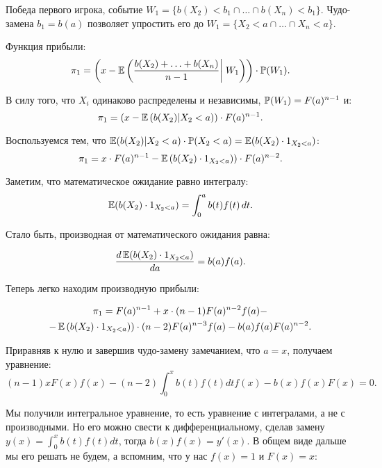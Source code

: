 \begin{enumerate}
Победа первого игрока, событие $ W_{1}=\{b(X_{2})<b_{1}\cap \ldots\cap b(X_{n})<b_{1}\} $. Чудо-замена  $b_{1}=b(a)$ позволяет упростить его до $ W_{1}=\{X_{2}<a\cap\ldots\cap X_{n}<a\} $.

Функция прибыли:
\begin{equation}
\pi_{1}=\left(x-\E\left(\frac{b(X_{2})+\ldots+b(X_{n})}{n-1} \right|\left.\vphantom{\frac{b(X_{2})+\ldots+b(X_{n})}{n-1}} W_{1}\right)\right)\cdot \P(W_{1}).
\end{equation}

В силу того, что $ X_{i} $ одинаково распределены и независимы, $ \P(W_{1})=F(a)^{n-1} $ и:
\begin{equation}
\pi_{1}=(x-\E\left(b(X_{2})|X_{2}<a)\right)\cdot F(a)^{n-1}.
\end{equation}

Воспользуемся тем, что $ \E(b(X_{2})|X_{2}<a)\cdot \P(X_{2}<a)=\E(b(X_{2})\cdot 1_{X_{2}<a}) $:
\begin{equation}
\pi_{1}=x\cdot F(a)^{n-1}-\E\left(b(X_{2})\cdot 1_{X_{2}<a})\right)\cdot F(a)^{n-2}.
\end{equation}

Заметим, что математическое ожидание равно интегралу:
\begin{equation}
\E(b(X_{2})\cdot 1_{X_{2}<a})=\int_{0}^{a}b(t)f(t) \, dt.
\end{equation}

Стало быть, производная от математического ожидания равна:

\begin{equation}
\frac{d \E(b(X_{2})\cdot 1_{X_{2}<a})}{d a}=b(a)f(a).
\end{equation}

Теперь легко находим производную прибыли:

\begin{multline}
\pi_{1}=F(a)^{n-1}+x\cdot (n-1) F(a)^{n-2}f(a)-\\
-\E\left(b(X_{2})\cdot 1_{X_{2}<a})\right)\cdot (n-2)F(a)^{n-3}f(a)-b(a)f(a)F(a)^{n-2}.
\end{multline}

Приравняв к нулю и завершив чудо-замену замечанием, что $ a=x $, получаем уравнение:
\begin{equation}
(n-1)xF(x)f(x)-(n-2)\int_{0}^{x}b(t)f(t)dt f(x)-b(x)f(x)F(x)=0.
\end{equation}

Мы получили интегральное уравнение, то есть уравнение с интегралами, а не с производными. Но его можно свести к дифференциальному, сделав замену $ y(x)=\int_{0}^{x}b(t)f(t)dt $, тогда $ b(x)f(x)=y'(x) $. В общем виде дальше мы его решать не будем, а вспомним, что у нас $ f(x)=1 $ и $ F(x)=x $:


\end{enumerate}
